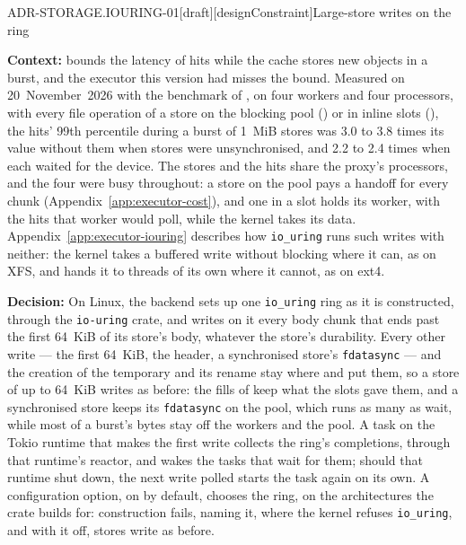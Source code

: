 \begin{requirement}{ADR-STORAGE.IOURING-01}[draft][designConstraint]{Large-store writes on the ring}


  \textbf{Context:}  bounds the
  latency of hits while the cache stores new objects in a burst, and the
  executor this version had misses the bound. Measured on 20~November~2026
  with the benchmark of , on four
  workers and four processors, with every file operation of a store on the
  blocking pool () or in inline slots
  (), the hits' 99th percentile during
  a burst of 1~MiB stores was 3.0 to 3.8 times its value without them when
  stores were unsynchronised, and 2.2 to 2.4 times when each waited for the
  device. The stores and the hits share the proxy's processors, and the
  four were busy throughout: a store on the pool pays a handoff for every
  chunk (Appendix~\ref{app:executor-cost}), and one in a slot holds its
  worker, with the hits that worker would poll, while the kernel takes its
  data. Appendix~\ref{app:executor-iouring} describes how
  \texttt{io\_uring} runs such writes with neither: the kernel takes a
  buffered write without blocking where it can, as on XFS, and hands it to
  threads of its own where it cannot, as on ext4.

  \textbf{Decision:} On Linux, the backend sets up one \texttt{io\_uring}
  ring as it is constructed, through the \texttt{io-uring} crate, and writes
  on it every body chunk that ends past the first 64~KiB of its store's
  body, whatever the store's durability. Every other write --- the first
  64~KiB, the header, a synchronised store's \texttt{fdatasync} --- and the
  creation of the temporary and its rename stay where
   and 
  put them, so a store of up to 64~KiB writes as before: the fills of
   keep what the slots gave them, and a
  synchronised store keeps its \texttt{fdatasync} on the pool, which runs
  as many as wait, while most of a burst's bytes stay off the workers and
  the pool. A task on the Tokio runtime that makes the first write collects
  the ring's completions, through that runtime's reactor, and wakes the tasks
  that wait for them; should that runtime shut down, the next write polled
  starts the task again on its own. A configuration option, on by
  default, chooses the ring, on the architectures the crate builds for:
  construction fails, naming it, where the kernel refuses
  \texttt{io\_uring}, and with it off, stores write as before.


\end{requirement}
